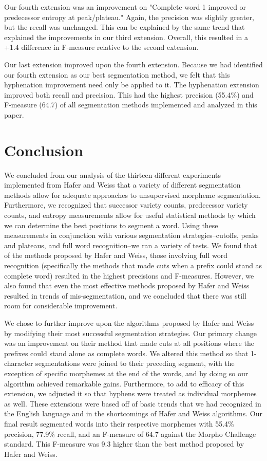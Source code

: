 \documentclass[11pt,letterpaper]{article}
\begin{document}
Our fourth extension was an improvement on "Complete word 1 improved or predecessor entropy at peak/plateau." Again, the precision was slightly greater, but the recall was unchanged. This can be explained by the same trend that explained the improvements in our third extension. Overall, this resulted in a +1.4 difference in F-measure relative to the second extension.

Our last extension improved upon the fourth extension. Because we had identified our fourth extension as our best segmentation method, we felt that this hyphenation improvement need only be applied to it. The hyphenation extension improved both recall and precision. This had the highest precision (55.4\%) and F-measure (64.7) of all segmentation methods implemented and analyzed in this paper.

\section{Conclusion}

We concluded from our analysis of the thirteen different experiments implemented from Hafer and Weiss that a variety of different segmentation methods allow for adequate approaches to unsupervised morpheme segmentation. Furthermore, we recognized that successor variety counts, predecessor variety counts, and entropy measurements allow for useful statistical methods by which we can determine the best positions to segment a word. Using these measurements in conjunction with various segmentation strategies--cutoffs, peaks and plateaus, and full word recognition--we ran a variety of tests. We found that of the methods proposed by Hafer and Weiss, those involving full word recognition (specifically the methods that made cuts when a prefix could stand as complete word) resulted in the highest precisions and F-measures. However, we also found that even the most effective methods proposed by Hafer and Weiss resulted in trends of mis-segmentation, and we concluded that there was still room for considerable improvement. \par

We chose to further improve upon the algorithms proposed by Hafer and Weiss by modifying their most successful segmentation strategies. Our primary change was an improvement on their method that made cuts at all positions where the prefixes could stand alone as complete words. We altered this method so that 1-character segmentations were joined to their preceding segment, with the exception of specific morphemes at the end of the words, and by doing so our algorithm achieved remarkable gains. Furthermore, to add to efficacy of this extension, we adjusted it so that hyphens were treated as individual morphemes as well. These extensions were based off of basic trends that we had recognized in the English language and in the shortcomings of Hafer and Weiss algorithms. Our final result segmented words into their respective morphemes with 55.4\% precision, 77.9\% recall, and an F-measure of 64.7 against the Morpho Challenge standard. This F-measure was 9.3 higher than the best method proposed by Hafer and Weiss. \par
\end{document}
